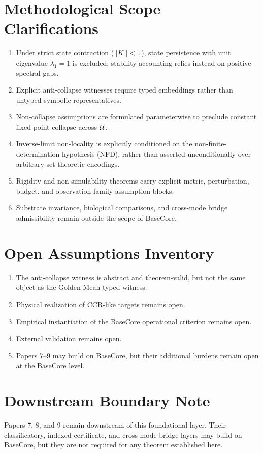 \section{Methodological Scope Clarifications}

\begin{enumerate}[leftmargin=*]
\item Under strict state contraction ($\left\lVert K \right\rVert<1$), state persistence with unit eigenvalue $\lambda_1=1$ is excluded; stability accounting relies instead on positive spectral gaps.
\item Explicit anti-collapse witnesses require typed embeddings rather than untyped symbolic representatives.
\item Non-collapse assumptions are formulated parameterwise to preclude constant fixed-point collapse across $\mathcal{U}$.
\item Inverse-limit non-locality is explicitly conditioned on the non-finite-determination hypothesis (NFD), rather than asserted unconditionally over arbitrary set-theoretic encodings.
\item Rigidity and non-simulability theorems carry explicit metric, perturbation, budget, and observation-family assumption blocks.
\item Substrate invariance, biological comparisons, and cross-mode bridge admissibility remain outside the scope of BaseCore.
\end{enumerate}

\section{Open Assumptions Inventory}

\begin{enumerate}[leftmargin=*]
\item The anti-collapse witness is abstract and theorem-valid, but not the same object as the Golden Mean typed witness.
\item Physical realization of CCR-like targets remains open.
\item Empirical instantiation of the BaseCore operational criterion remains open.
\item External validation remains open.
\item Papers 7--9 may build on BaseCore, but their additional burdens remain open at the BaseCore level.
\end{enumerate}

\section{Downstream Boundary Note}

Papers 7, 8, and 9 remain downstream of this foundational layer. Their classificatory, indexed-certificate, and cross-mode bridge layers may build on BaseCore, but they are not required for any theorem established here.
